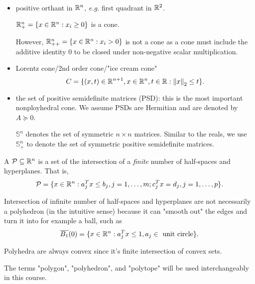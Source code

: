\documentclass[class=article,crop=false]{standalone}
\begin{document}
\begin{eg}[cones]
	~\begin{itemize}
		\item positive orthant in $ \mathbb{R}^{n}$, \emph{e.g.} first quadrant in $ \mathbb{R}^2$.

			$ \mathbb{R}^{n}_+ = \{x \in \mathbb{R}^{n}: x_i \geq 0\} $ is a cone.

			However, $ \mathbb{R}^{n}_{++} = \{x \in \mathbb{R}^{n}: x_i >0\} $ is not a cone as a cone must include the additive identity 0 to be closed under non-negative scalar multiplication.
		\item Lorentz cone/2nd order cone/"ice cream cone"
			\[
				C= \{(x,t) \in \mathbb{R}^{n+1}, x \in \mathbb{R}^{n}, t \in \mathbb{R}: {\left\lVert{ x}\right\rVert}_2 \leq t   \} 
			.\]
		\item the set of positive semidefinite matrices (PSD): this is the most important nonployhedral cone. We assume PSDs are Hermitian and are denoted by $A \succeq 0$.
			\begin{notation}
				$ \mathbb{S}^n$ denotes the set of symmetric  $ n\times n$ matrices. Similar to the reals, we use $ \mathbb{S}_+^n$ to denote the set of symmetric positive semidefinite matrices. 
			\end{notation}
	\end{itemize}
\end{eg}

\begin{defn}[polyhedron]
	A  $ \mathcal{ P} \subseteq \mathbb{R}^{n}$ is a set of the intersection of a \emph{finite} number of half-spaces and hyperplanes. That is,
	\[
	\mathcal{ P} = \{x \in \mathbb{R}^{n}: a_j^{T} x \leq b_j, j=1,\ldots,m; c_j^{T}x= d_j, j=1,\ldots,p\} 
	.\] 
\end{defn}

\begin{note}
	Intersection of infinite number of half-spaces and hyperplanes are not necessarily a polyhedron (in the intuitive sense) because it can "smooth out" the edges and turn it into for example a ball, such as
\[
	\overline{B_{ 1}} (  0) = \{x \in \mathbb{R}^{n}: a_j^{T} x \leq 1, a_j \in \text{ unit circle} \} 
.\] 
\end{note}
\begin{note}
	Polyhedra are always convex since it's finite intersection of convex sets.
\end{note}

\begin{note}
The terms "polygon", "polyhedron", and "polytope" will be used interchangeably in this course.
\end{note}
\end{document}
